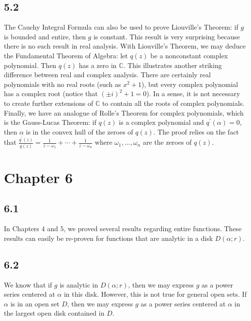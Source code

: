 \documentclass[12pt]{article}
\newcommand{\cc}{{\mathbb C}}
\begin{document}
\subsection*{5.2}
The Cauchy Integral Formula can also be used to prove Liouville's Theorem: if $g$ is bounded and entire, then $g$ is constant. This result is very surprising because there is no such result in real analysis. With Liouville's Theorem, we may deduce the Fundamental Theorem of Algebra: let $q(z)$ be a nonconstant complex polynomial. Then $q(z)$ has a zero in $\cc$. This illustrates another striking difference between real and complex analysis. There are certainly real polynomials with no real roots (such as $x^2+1$), but every complex polynomial has a complex root (notice that $(\pm i)^2 + 1 = 0$). In a sense, it is not necessary to create further extensions of $\cc$ to contain all the roots of complex polynomials. Finally, we have an analogue of Rolle's Theorem for complex polynomials, which is the Gauss-Lucas Theorem: if $q(z)$ is a complex polynomial and $q^\prime(\alpha) = 0$, then $\alpha$ is in the convex hull of the zeroes of $q(z)$. The proof relies on the fact that \(\frac{q^\prime(z)}{q(z)} = \frac{1}{z - \omega_1} + \cdots + \frac{1}{z-\omega_n}\) where $\omega_1,\ldots,\omega_n$ are the zeroes of $q(z)$.

\section*{Chapter 6}
\subsection*{6.1}
In Chapters $4$ and $5$, we proved several results regarding entire functions. These results can easily be re-proven for functions that are analytic in a disk $D(\alpha; r)$.
\subsection*{6.2}
We know that if $g$ is analytic in $D(\alpha;r)$, then we may express $g$ as a power series centered at $\alpha$ in this disk. However, this is not true for general open sets. If $\alpha$ is in an open set $D$, then we may express $g$ as a power series centered at $\alpha$ in the largest open disk contained in $D$.
\end{document}

